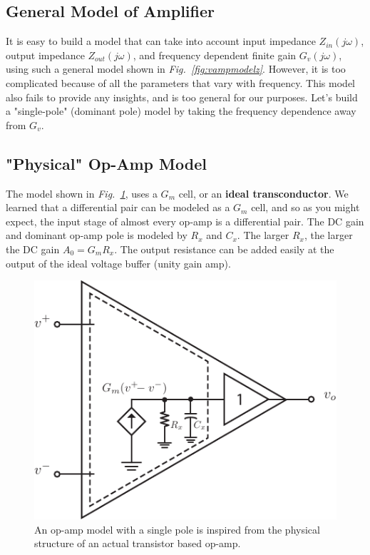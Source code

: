 \subsection{General Model of Amplifier}
It is easy to build a model that can take into account input impedance $Z_{in}(j\omega)$, output impedance $Z_{out}(j\omega)$, and frequency dependent finite gain $G_v(j\omega)$, using such a general model shown in \emph{Fig.~\ref{fig:vampmodelz}}.  However, it is too complicated because of all the parameters that vary with frequency.  This model also fails to provide any insights, and is too general for our purposes.  Let's build a "single-pole" (dominant pole) model by taking the frequency dependence away from $G_v$.
\subsection{"Physical" Op-Amp Model}
The model shown in \emph{Fig.~\ref{fig:opamp_model_pole}}, uses a $G_m$ cell, or an \textbf{ideal transconductor}.  We learned that a differential pair can be modeled as a $G_m$ cell, and so as you might expect, the input stage of almost every op-amp is a differential pair.  The DC gain and dominant op-amp pole is modeled by $R_x$ and $C_x$.  The larger $R_x$, the larger the DC gain $A_0 = G_m R_x$.  The output resistance can be added easily at the output of the ideal voltage buffer (unity gain amp).
\vspace{1cm}
\begin{figure}[H]
\centering
\includegraphics[scale=1.35]{opamp_model_pole}
\caption{An op-amp model with a single pole is inspired from the physical structure of an actual transistor based op-amp.}
\label{fig:opamp_model_pole}
\end{figure}
\newpage

